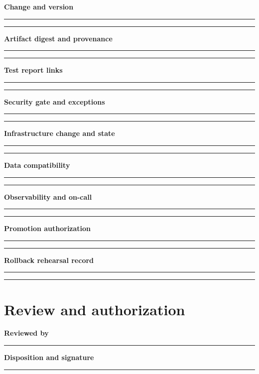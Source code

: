 \documentclass[10pt,letterpaper]{article}
\begin{document}
\textbf{Change and version}\par
\noindent\rule{\linewidth}{0.35pt}\par\vspace{0.7em}
\noindent\rule{\linewidth}{0.35pt}\par\vspace{0.7em}
\textbf{Artifact digest and provenance}\par
\noindent\rule{\linewidth}{0.35pt}\par\vspace{0.7em}
\noindent\rule{\linewidth}{0.35pt}\par\vspace{0.7em}
\textbf{Test report links}\par
\noindent\rule{\linewidth}{0.35pt}\par\vspace{0.7em}
\noindent\rule{\linewidth}{0.35pt}\par\vspace{0.7em}
\textbf{Security gate and exceptions}\par
\noindent\rule{\linewidth}{0.35pt}\par\vspace{0.7em}
\noindent\rule{\linewidth}{0.35pt}\par\vspace{0.7em}
\textbf{Infrastructure change and state}\par
\noindent\rule{\linewidth}{0.35pt}\par\vspace{0.7em}
\noindent\rule{\linewidth}{0.35pt}\par\vspace{0.7em}
\textbf{Data compatibility}\par
\noindent\rule{\linewidth}{0.35pt}\par\vspace{0.7em}
\noindent\rule{\linewidth}{0.35pt}\par\vspace{0.7em}
\textbf{Observability and on-call}\par
\noindent\rule{\linewidth}{0.35pt}\par\vspace{0.7em}
\noindent\rule{\linewidth}{0.35pt}\par\vspace{0.7em}
\textbf{Promotion authorization}\par
\noindent\rule{\linewidth}{0.35pt}\par\vspace{0.7em}
\noindent\rule{\linewidth}{0.35pt}\par\vspace{0.7em}
\textbf{Rollback rehearsal record}\par
\noindent\rule{\linewidth}{0.35pt}\par\vspace{0.7em}
\noindent\rule{\linewidth}{0.35pt}\par\vspace{0.7em}
\section{Review and authorization}
\textbf{Reviewed by}\par
\noindent\rule{\linewidth}{0.35pt}\par\vspace{0.7em}
\textbf{Disposition and signature}\par
\noindent\rule{\linewidth}{0.35pt}\par\vspace{0.7em}
\end{document}

